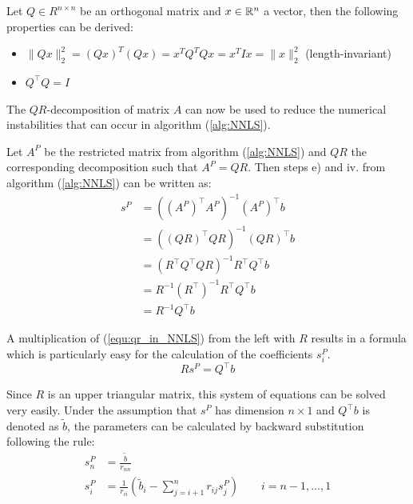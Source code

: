\begin{remark} Let $Q \in R^{n \times n}$ be an orthogonal matrix and $x \in \mathbb{R}^n$ a vector, then the following properties can be derived:
	\begin{itemize}
		\item $\lVert Qx \rVert_2^2 = (Qx)^T (Qx) = x^T Q^T Q x = x^T I x = \lVert x \rVert_2^2$ \hfill (length-invariant)
		\item $Q^\top Q = I$
	\end{itemize}
\end{remark}

The $QR$-decomposition of matrix $A$ can now be used to reduce the numerical instabilities that can occur in algorithm (\ref{alg:NNLS}). 

\begin{remark} Let $A^P$ be the restricted matrix from algorithm (\ref{alg:NNLS}) and $QR$ the corresponding decomposition such that $A^P = QR$. Then steps e) and iv. from algorithm (\ref{alg:NNLS}) can be written as:
	\begin{equation}\label{equ:qr_in_NNLS}
		\begin{aligned}
			 s^P 	&= ((A^P)^\top A^P)^{-1} (A^P)^\top b \\
			 		&= ((QR)^\top QR)^{-1} (QR)^\top b \\
			 		&= (R^\top Q^\top Q R)^{-1} R^\top Q^\top b \\
			 		&= R^{-1} (R^\top)^{-1} R^\top Q^\top b \\
			 		&= R^{-1} Q^\top b
		\end{aligned}
	\end{equation}
\end{remark}

A multiplication of (\ref{equ:qr_in_NNLS}) from the left with $R$ results in a formula which is particularly easy for the calculation of the coefficients $s^P_i$.
\begin{equation}
	R s^P = Q^\top b
\end{equation}

Since $R$ is an upper triangular matrix, this system of equations can be solved very easily. Under the assumption that $s^P$ has dimension $n \times 1$ and $Q^\top b$ is denoted as $\tilde{b}$, the parameters can be calculated by backward substitution following the rule:
\begin{align*}
	s^P_n 	&= \frac{\tilde{b}}{r_{nn}} \\
	s^P_i	&= \frac{1}{r_{ii}} \left( \tilde{b}_i - \sum_{j = i + 1}^{n} r_{ij} s^P_j\right) \quad \quad i = n-1, ..., 1
\end{align*}


